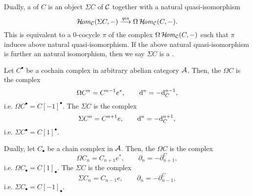 {Dually, a  of $C$ 
is an object $\Sigma C$ of ${\cal C}$ together with a natural quasi-isomorphism 
\[
\operatorname{\mathcal{H}\!\mathit{om}}_{{\cal C}}(\Sigma C,-)\stackrel{{qis}}{\longrightarrow} 
\Omega\operatorname{\mathcal{H}\!\mathit{om}}_{{\cal C}}(C,-).
\]
This is equivalent to a $0$-cocycle $\pi$ of the complex
$\Omega\operatorname{\mathcal{H}\!\mathit{om}}_{{\cal C}}(C,-)$ 
such that $\pi$ induces above 
natural quasi-isomorphism. 
If the above natural quasi-isomorphism 
is further an natural isomorphism, 
then we say $\Sigma C$ is 
a .

Let $C^{\bullet}$ be a cochain complex 
in arbitrary abelian category ${\cal A}$. 
Then, the  $\Omega C$ 
is the complex 
\[
\Omega C^n = C^{n-1}e^{\ast}, \qquad
\mathrm{d}^n = -\mathrm{d}_C^{n-1}, 
\]
i.e. $\Omega C^{\bullet}=C[-1]^{\bullet}$. 
The  $\Sigma C$ 
is the complex 
\[
\Sigma C^n = C^{n+1}e, \qquad
\mathrm{d}^n = -\mathrm{d}_C^{n+1}, 
\]
i.e. $\Sigma C^{\bullet}=C[1]^{\bullet}$. 

Dually, let $C_{\bullet}$ 
be a chain complex in ${\cal A}$. 
Then, the  $\Omega C$ 
is the complex 
\[
\Omega C_n = C_{n+1}e^{\ast},\qquad
\partial_n = -\partial^C_{n+1},
\]
i.e. $\Omega C_{\bullet}=C[1]_{\bullet}$.
The  $\Sigma C$ 
is the complex 
\[
\Sigma C_n = C_{n-1}e, \qquad
\partial_n = -\partial^C_{n-1},
\]
i.e. $\Sigma C_{\bullet}=C[-1]_{\bullet}$.
}












\clearpage
